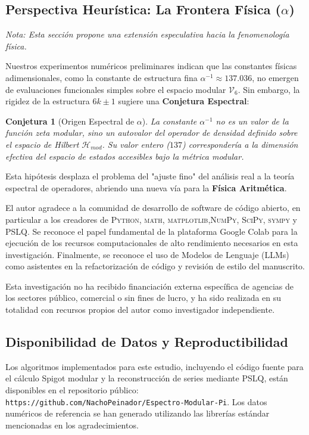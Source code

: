 \documentclass{article}
\theoremstyle{plain}
\newtheorem{conjecture}[theorem]{Conjetura}
\theoremstyle{definition}
\theoremstyle{remark}
\numberwithin{equation}{section}
\begin{document}
\subsection{Perspectiva Heurística: La Frontera Física ($\alpha$)}
\textit{Nota: Esta sección propone una extensión especulativa hacia la fenomenología física.}

Nuestros experimentos numéricos preliminares indican que las constantes físicas adimensionales, como la constante de estructura fina $\alpha^{-1} \approx 137.036$, no emergen de evaluaciones funcionales simples sobre el espacio modular $\mathcal{V}_6$.
Sin embargo, la rigidez de la estructura $6k \pm 1$ sugiere una \textbf{Conjetura Espectral}:
\begin{conjecture}[Origen Espectral de $\alpha$]
La constante $\alpha^{-1}$ no es un valor de la función zeta modular, sino un autovalor del operador de densidad definido sobre el espacio de Hilbert $\mathcal{H}_{mod}$. Su valor entero ($137$) correspondería a la dimensión efectiva del espacio de estados accesibles bajo la métrica modular.
\end{conjecture}
Esta hipótesis desplaza el problema del "ajuste fino" del análisis real a la teoría espectral de operadores, abriendo una nueva vía para la \textbf{Física Aritmética}.

\begin{ack}
El autor agradece a la comunidad de desarrollo de software de código abierto, en particular a los creadores de \textsc{Python}, \textsc{math}, \textsc{matplotlib},\textsc{NumPy}, \textsc{SciPy}, \textsc{sympy} y \textsc{PSLQ}. Se reconoce el papel fundamental de la plataforma Google Colab para la ejecución de los recursos computacionales de alto rendimiento necesarios en esta investigación. Finalmente, se reconoce el uso de Modelos de Lenguaje (LLMs) como asistentes en la refactorización de código y revisión de estilo del manuscrito. 
\end{ack}

\begin{funding}
Esta investigación no ha recibido financiación externa específica de agencias de los sectores público, comercial o sin fines de lucro, y ha sido realizada en su totalidad con recursos propios del autor como investigador independiente.
\end{funding}

\subsection*{Disponibilidad de Datos y Reproductibilidad}
Los algoritmos implementados para este estudio, incluyendo el código fuente para el cálculo Spigot modular y la reconstrucción de series mediante PSLQ, están disponibles en el repositorio público: \texttt{https://github.com/NachoPeinador/Espectro-Modular-Pi}. Los datos numéricos de referencia se han generado utilizando las librerías estándar mencionadas en los agradecimientos.
\end{document}
